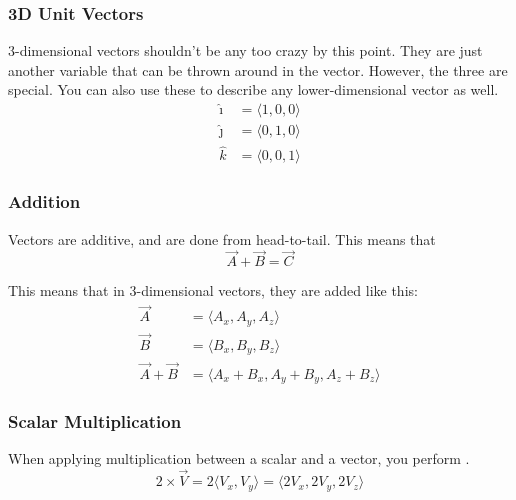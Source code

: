 \subsubsection{3D Unit Vectors}\label{subsubsec:3D Unit Vectors}
3-dimensional vectors shouldn't be any too crazy by this point.
They are just another variable that can be thrown around in the vector.
However, the three  are special.
You can also use these to describe any lower-dimensional vector as well.
\begin{equation}
  \begin{aligned}
    \hat{\imath} &= \langle 1, 0, 0 \rangle \\
    \hat{\jmath} &= \langle 0, 1, 0 \rangle \\
    \hat{k} &= \langle 0, 0, 1 \rangle
  \end{aligned}
\end{equation}

\subsubsection{Addition}\label{subsubsec:Vector Addition}
Vectors are additive, and are done from head-to-tail.
This means that
\begin{equation}\label{eq:Vector Addition}
  \vec{A} + \vec{B} = \vec{C}
\end{equation}

This means that in 3-dimensional vectors, they are added like this:
\begin{equation}\label{eq:3D Vector Addition}
  \begin{aligned}
    \vec{A} &= \langle A_{x}, A_{y}, A_{z} \rangle \\
    \vec{B} &= \langle B_{x}, B_{y}, B_{z} \rangle \\
    \vec{A} + \vec{B} &= \langle A_{x}+B_{x}, A_{y}+B_{y}, A_{z}+B_{z} \rangle
  \end{aligned}
\end{equation}

\subsubsection{Scalar Multiplication}\label{subsubsec:Scalar Vector Multiplication}
When applying multiplication between a scalar and a vector, you perform .
\begin{equation}\label{eq:Scalar Vector Multiplication}
  2 \times \vec{V} = 2 \langle V_{x}, V_{y} \rangle = \langle 2V_{x}, 2V_{y}, 2V_{z} \rangle
\end{equation}

